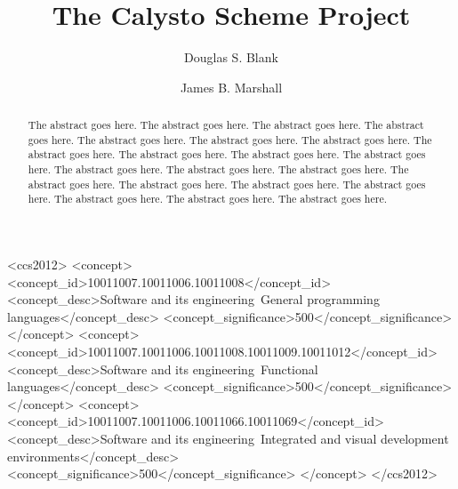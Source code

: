 \documentclass[acmsmall,screen,authorversion]{acmart}
\begin{document}
\title[Calysto Scheme]{The Calysto Scheme Project}

\author{Douglas S. Blank}

\author{James B. Marshall}
\authornotemark[1]

\renewcommand{\shortauthors}{D. S. Blank and J. B. Marshall}

\begin{abstract}
The abstract goes here. The abstract goes here. The abstract goes here. The
abstract goes here. The abstract goes here. The abstract goes here. The
abstract goes here. The abstract goes here. The abstract goes here. The
abstract goes here. The abstract goes here. The abstract goes here. The
abstract goes here. The abstract goes here. The abstract goes here. The
abstract goes here. The abstract goes here. The abstract goes here. The
abstract goes here. The abstract goes here. The abstract goes here.
\end{abstract}

\begin{CCSXML}
<ccs2012>
<concept>
<concept_id>10011007.10011006.10011008</concept_id>
<concept_desc>Software and its engineering~General programming languages</concept_desc>
<concept_significance>500</concept_significance>
</concept>
<concept>
<concept_id>10011007.10011006.10011008.10011009.10011012</concept_id>
<concept_desc>Software and its engineering~Functional languages</concept_desc>
<concept_significance>500</concept_significance>
</concept>
<concept>
<concept_id>10011007.10011006.10011066.10011069</concept_id>
<concept_desc>Software and its engineering~Integrated and visual development environments</concept_desc>
<concept_significance>500</concept_significance>
</concept>
</ccs2012>
\end{CCSXML}
\end{document}
